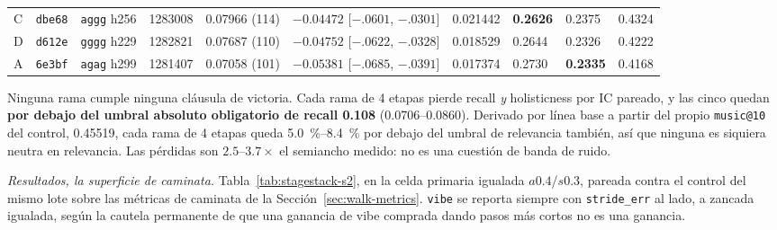 \documentclass[11pt]{article}
\newcommand{\best}[1]{\textbf{#1}}
\begin{document}
\begin{table}[ht]
{\begin{tabular}{lllrllllll}
    C & \texttt{dbe68} & \texttt{aggg} h256 & \num{1283008} & 0.07966 (114) & $-0.04472$ [$-.0601$, $-.0301$] & 0.021442 & \best{0.2626} & 0.2375 & 0.4324 \\
    D & \texttt{d612e} & \texttt{gggg} h229 & \num{1282821} & 0.07687 (110) & $-0.04752$ [$-.0622$, $-.0328$] & 0.018529 & 0.2644 & 0.2326 & 0.4222 \\
    A & \texttt{6e3bf} & \texttt{agag} h299 & \num{1281407} & 0.07058 (101) & $-0.05381$ [$-.0685$, $-.0391$] & 0.017374 & 0.2730 & \best{0.2335} & 0.4168 \\
    \bottomrule
  \end{tabular}}
\end{table}

Ninguna rama cumple ninguna cláusula de victoria. Cada rama de 4 etapas pierde
recall \emph{y} holisticness por IC pareado, y las cinco quedan \textbf{por debajo
del umbral absoluto obligatorio de recall \num{0.108}}
(\numrange{0.0706}{0.0860}). Derivado por línea base a partir del propio
\texttt{music@10} del control, \num{0.45519}, cada rama de 4 etapas queda
\SIrange{5.0}{8.4}{\percent} por debajo del umbral de relevancia también, así que
ninguna es siquiera neutra en relevancia. Las pérdidas son
$\numrange{2.5}{3.7}\times$ el semiancho medido: no es una cuestión de banda de
ruido.

\emph{Resultados, la superficie de caminata.} Tabla~\ref{tab:stagestack-s2}, en la
celda primaria igualada $a\num{0.4}$/$s\num{0.3}$, pareada contra el control del
mismo lote sobre las métricas de caminata de la Sección~\ref{sec:walk-metrics}. \texttt{vibe} se
reporta siempre con \texttt{stride\_err} al lado, a zancada igualada, según la
cautela permanente de que una ganancia de vibe comprada dando pasos más cortos no es
una ganancia.
\end{document}
